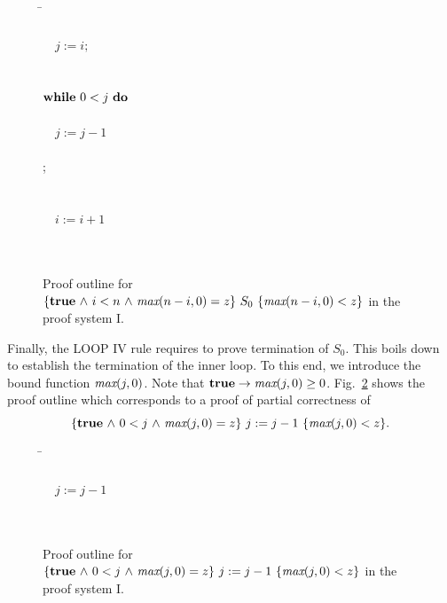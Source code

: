 \documentclass[runningheads]{llncs}       %
\begin{document}
 \begin{figure}[ht]
 \begin{tabbing}
 \qquad\qquad                                       
\=   \\
\>                           \\
\>  \ \ $j:=i; $                                \\
\>                            \\
\>             \\
\>  $\mbox{$\mbox{{\bf while}\ } {0 < j}\ \mbox{{\bf do}\ }$}$                          \\
\>  \qquad {}                  \\
\>  \qquad \ \ $j:=j-1$                         \\
\> \qquad {}                    \\
\>  \OD ;                                       \\
\>            \\
\>                       \\
\>  \ \ $i:=i+1$                                \\
\>                            \\
\>                \\
[\bigskipamount]
\end{tabbing}
\caption{Proof outline for $\mbox{$\{{\mbox{{\bf true}}\mbox{$\ \wedge\ $} i < n \mbox{$\ \wedge\ $} \mbox{\it max}(n-i,0) = z}\}\ {S_0}\ \{{\mbox{\it max}(n-i,0) < z}\}$}$  in the proof system I.}
\label{fig:po2}

\end{figure}

Finally, the LOOP IV rule requires to prove termination of $S_0$.
This boils down to establish the termination of the inner loop.
To this end, we introduce
the bound function $\mbox{\it max}(j,0)$.
Note that $\mbox{{\bf true}}\to \mbox{\it max}(j,0)\geq 0$. 
Fig.~\ref{fig:po3} shows the proof outline
which corresponds to a proof of  partial correctness of
$$\mbox{$\{{\mbox{{\bf true}}\mbox{$\ \wedge\ $} 0<j\mbox{$\ \wedge\ $}  \mbox{\it max}(j,0)= z}\}\ {j:=j-1}\ \{{\mbox{\it max}(j,0) < z}\}$}.$$

 \begin{figure}[htbp]
 \begin{tabbing}
 \qquad\qquad    
\=       \\
\>                          \\
\>  \ \ $j:=j-1$                               \\
\>                             \\
\>                 \\
\end{tabbing}
\caption{Proof outline for $\mbox{$\{{\mbox{{\bf true}}\mbox{$\ \wedge\ $} 0<j\mbox{$\ \wedge\ $}  \mbox{\it max}(j,0)= z}\}\ {j:=j-1}\ \{{\mbox{\it max}(j,0) < z}\}$}$  in the proof system I.}
\label{fig:po3}

\end{figure}
\end{document}
